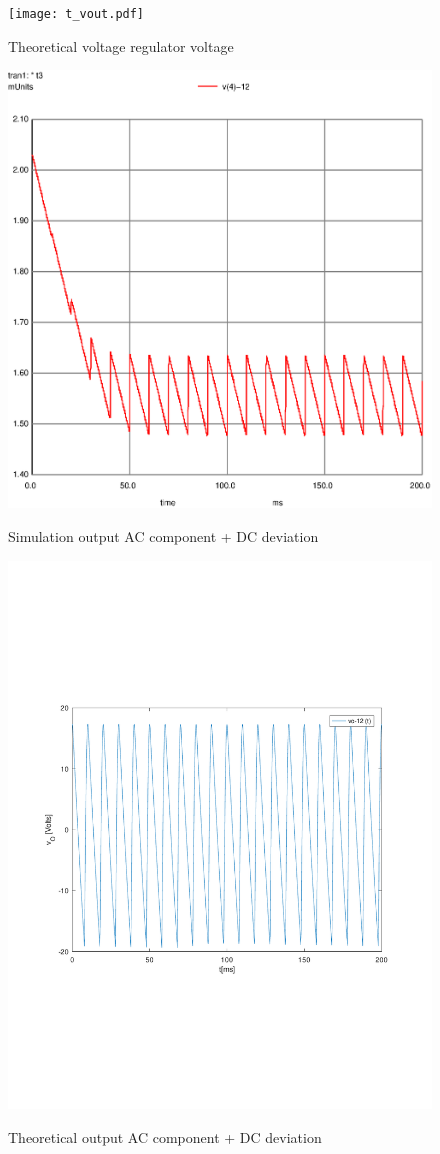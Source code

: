 \begin{figure}[!ht] \centering
\caption{Theoretical voltage regulator voltage}
\squeezeup 
\squeezeup 
\squeezeup 
\squeezeup 
\squeezeup 
\squeezeup 
\squeezeup 
\squeezeup 
\texttt{[image: t\_vout.pdf]}
\label{fig:theo2}
\end{figure}

\begin{figure}[!ht] \centering
\caption{Simulation output AC component + DC deviation}
\includegraphics[width=0.6\linewidth]{vout(ac+dc).eps}
\label{fig:sim3}
\end{figure}

\begin{figure}[!ht] \centering
\caption{Theoretical output AC component + DC deviation}
\squeezeup 
\squeezeup 
\squeezeup 
\squeezeup 
\squeezeup 
\squeezeup 
\squeezeup 
\squeezeup 
\includegraphics[width=0.8\linewidth]{deviation.pdf}
\label{fig:theo2}
\end{figure}

